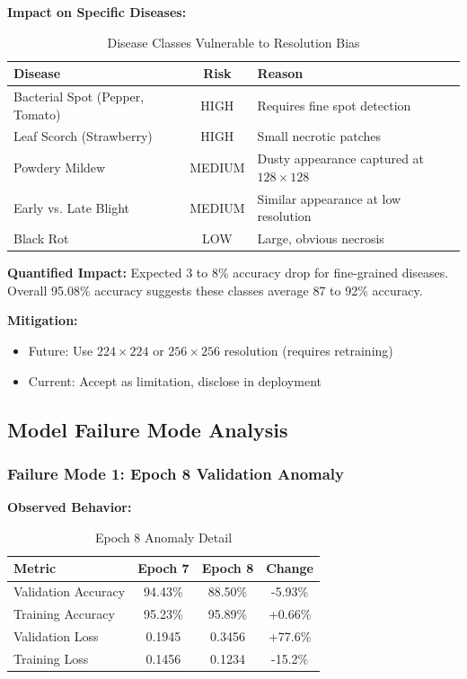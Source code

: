 \documentclass[11pt,a4paper]{article}
\begin{document}
\textbf{Impact on Specific Diseases:}

\begin{table}[H]
\centering
\caption{Disease Classes Vulnerable to Resolution Bias}
\label{tab:resolution_vulnerable}
\begin{tabularx}{\textwidth}{l c >{\raggedright\arraybackslash}X}
\toprule
\rowcolor{primarynavy}
\color{white}\textbf{Disease} & \color{white}\textbf{Risk} & \color{white}\textbf{Reason} \\
\midrule
Bacterial Spot (Pepper, Tomato) & HIGH & Requires fine spot detection \\
\rowcolor{iceblue}
Leaf Scorch (Strawberry) & HIGH & Small necrotic patches \\
Powdery Mildew & MEDIUM & Dusty appearance captured at $128 \times 128$ \\
\rowcolor{iceblue}
Early vs. Late Blight & MEDIUM & Similar appearance at low resolution \\
Black Rot & LOW & Large, obvious necrosis \\
\bottomrule
\end{tabularx}
\end{table}

\textbf{Quantified Impact:} Expected 3 to 8\% accuracy drop for fine-grained diseases. Overall 95.08\% accuracy suggests these classes average 87 to 92\% accuracy.

\textbf{Mitigation:}
\begin{itemize}
  \item Future: Use $224 \times 224$ or $256 \times 256$ resolution (requires retraining)
  \item Current: Accept as limitation, disclose in deployment
\end{itemize}

\subsection{Model Failure Mode Analysis}

\subsubsection{Failure Mode 1: Epoch 8 Validation Anomaly}

\textbf{Observed Behavior:}

\begin{table}[H]
\centering
\caption{Epoch 8 Anomaly Detail}
\label{tab:epoch8}
\begin{tabularx}{\textwidth}{l c c c}
\toprule
\rowcolor{primarynavy}
\color{white}\textbf{Metric} & \color{white}\textbf{Epoch 7} & \color{white}\textbf{Epoch 8} & \color{white}\textbf{Change} \\
\midrule
Validation Accuracy & 94.43\% & 88.50\% & -5.93\% \\
\rowcolor{iceblue}
Training Accuracy & 95.23\% & 95.89\% & +0.66\% \\
Validation Loss & 0.1945 & 0.3456 & +77.6\% \\
\rowcolor{iceblue}
Training Loss & 0.1456 & 0.1234 & -15.2\% \\
\bottomrule
\end{tabularx}
\end{table}
\end{document}

